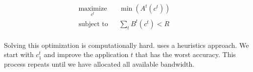 

\begin{equation}
 \label{eq:multitask}
 \begin{aligned}
    & \underset{c^t}{\text{maximize}} & & \min({A^t(c^t)}) & & \\
    & \text{subject to} & & \sum_t{B^t(c^t)} < R & & \\
 \end{aligned}
\end{equation}

Solving this optimization is computationally hard. \sysname{} uses a heuristics
approach. We start with $c_1^t$ and improve the application $t$ that has the
worst accuracy. This process repeats until we have allocated all available
bandwidth.

